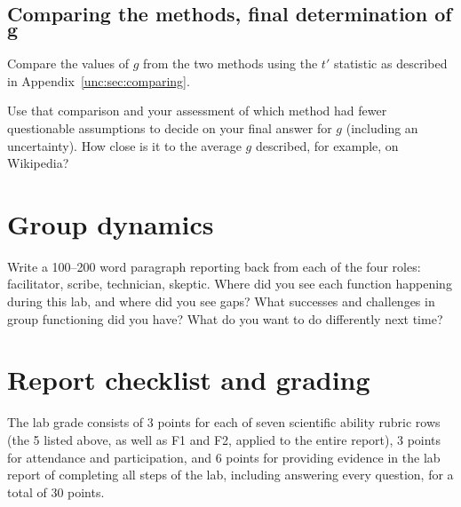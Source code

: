 \subsection{Comparing the methods, final determination of $\bm{g}$}

\begin{steps}
	\item Compare the values of $g$ from the two methods using the $t'$ statistic as described in Appendix~\ref{unc:sec:comparing}.
	
	\item Use that comparison and your assessment of which method had fewer questionable assumptions to decide on your final answer for $g$ (including an uncertainty). How close is it to the average $g$ described, for example, on Wikipedia?
\end{steps}

\section{Group dynamics}

\begin{steps}
	\item Write a 100--200 word paragraph reporting back from each of the four roles: facilitator, scribe, technician, skeptic. Where did you see each function happening during this lab, and where did you see gaps? What successes and challenges in group functioning did you have? What do you want to do differently next time?
\end{steps}

\section{Report checklist and grading}

The lab grade consists of 3 points for each of seven scientific ability rubric rows (the 5 listed above, as well as F1 and F2, applied to the entire report), 3 points for attendance and participation, and 6 points for providing evidence in the lab report of completing all steps of the lab, including answering every question, for a total of 30 points.